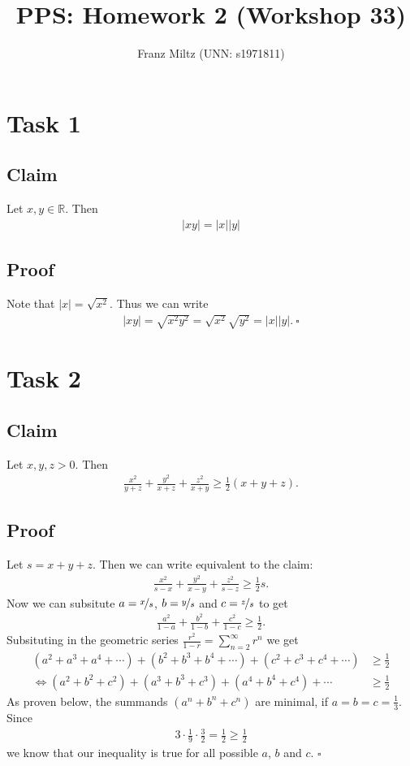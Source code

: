 \documentclass{article}
\title{PPS: Homework 2 (Workshop 33)}
\author{Franz Miltz (UNN: s1971811)}
\begin{document}
\maketitle
\section*{Task 1}
\subsection*{Claim}
Let $x,y\in\mathbb{R}$. Then
\begin{align*}
  |xy|=|x||y|
\end{align*}
\subsection*{Proof}
Note that $|x|=\sqrt{x^2}$. Thus we can write
\begin{align*}
  |xy|=\sqrt{x^2y^2}=\sqrt{x^2}\sqrt{y^2}=|x||y|.\:\square
\end{align*}
\section*{Task 2}
\subsection*{Claim} 
Let $x,y,z>0$. Then
\begin{align*}
  \frac{x^2}{y+z}+\frac{y^2}{x+z}+\frac{z^2}{x+y}\geq\frac{1}{2}(x+y+z).
\end{align*}
\subsection*{Proof}
Let $s=x+y+z$. Then we can write equivalent to the claim:
\begin{align*}
  \frac{x^2}{s-x}+\frac{y^2}{x-y}+\frac{z^2}{s-z}\geq\frac{1}{2}s.
\end{align*}
Now we can subsitute $a=\nicefrac{x}{s}$, $b=\nicefrac{y}{s}$ and $c=\nicefrac{z}{s}$ to get
\begin{align*}
  \frac{a^2}{1-a}+\frac{b^2}{1-b}+\frac{c^2}{1-c}\geq \frac{1}{2}.
\end{align*}
Subsituting in the geometric series $\frac{r^2}{1-r}=\sum_{n=2}^\infty r^n$ we get
\begin{align*}
  (a^2+a^3+a^4+\cdots)+(b^2+b^3+b^4+\cdots)+(c^2+c^3+c^4+\cdots) &\geq \frac{1}{2}\\
  \Leftrightarrow (a^2+b^2+c^2)+(a^3+b^3+c^3)+(a^4+b^4+c^4)+\cdots &\geq \frac{1}{2}
\end{align*}
As proven below, the summands $(a^n+b^n+c^n)$ are minimal, if $a=b=c=\frac{1}{3}$. Since
\begin{align*}
  3\cdot\frac{1}{9}\cdot\frac{3}{2}=\frac{1}{2}\geq \frac{1}{2}
\end{align*}
we know that our inequality is true for all possible $a$, $b$ and $c$. $\square$\\
\end{document}
